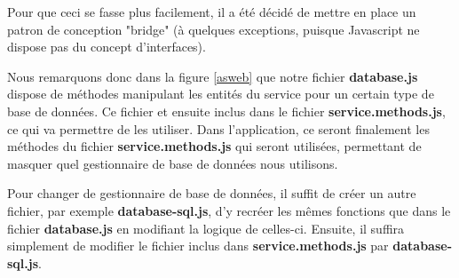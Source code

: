     Pour que ceci se fasse plus facilement, il a été décidé de mettre en place un patron de conception "bridge" (à quelques exceptions, puisque Javascript ne dispose pas du concept d'interfaces).

    Nous remarquons donc dans la figure \ref{asweb} que notre fichier \textbf{database.js} dispose de méthodes manipulant les entités du service pour un certain type de base de données. Ce fichier et ensuite inclus dans le fichier \textbf{service.methods.js}, ce qui va permettre de les utiliser. Dans l'application, ce seront finalement les méthodes du fichier \textbf{service.methods.js} qui seront utilisées, permettant de masquer quel gestionnaire de base de données nous utilisons.
    
    Pour changer de gestionnaire de base de données, il suffit de créer un autre fichier, par exemple \textbf{database-sql.js}, d'y recréer les mêmes fonctions que dans le fichier \textbf{database.js} en modifiant la logique de celles-ci. Ensuite, il suffira simplement de modifier le fichier inclus dans \textbf{service.methods.js} par \textbf{database-sql.js}.

